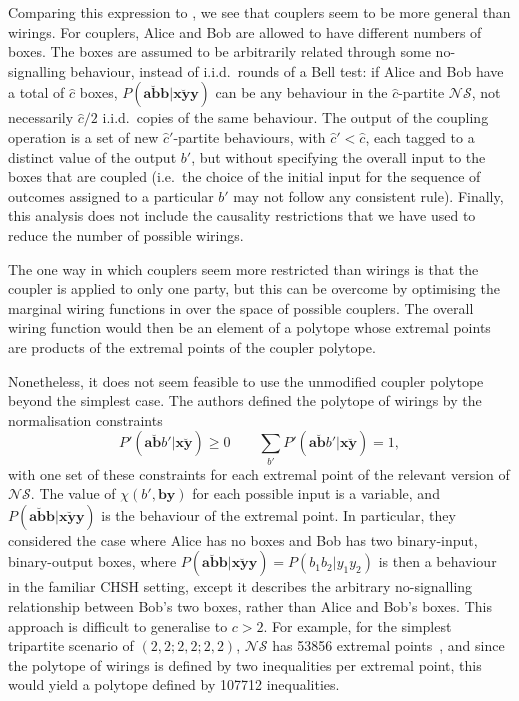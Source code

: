 \documentclass[10pt, a4paper]{article}
\numberwithin{equation}{section} %
\theoremstyle{definition}
\theoremstyle{plain}
\newcommand{\?}{\mathrel{?}} %
\newcommand{\cvec}[1]{\boldsymbol{\mathbf{#1}}}    %
\newcommand{\NSs}{\mathcal{NS}}
\begin{document}

      Comparing this expression to , we see that couplers seem to be more general than wirings. For couplers, Alice and Bob are allowed to have different numbers of boxes. The boxes are assumed to be arbitrarily related through some no-signalling behaviour, instead of i.i.d.\ rounds of a Bell test: if Alice and Bob have a total of \(\hat{c}\) boxes, \(P(\cvec{a\breve{b}b}|\cvec{x\breve{y}y})\) can be any behaviour in the \(\hat{c}\)-partite \(\NSs\), not necessarily \(\hat{c}/2\) i.i.d.\ copies of the same behaviour. The output of the coupling operation is a set of new \(\hat{c}'\)-partite behaviours, with \(\hat{c}' < \hat{c}\), each tagged to a distinct value of the output \(b'\), but without specifying the overall input to the boxes that are coupled (i.e.\ the choice of the initial input for the sequence of outcomes assigned to a particular \(b'\) may not follow any consistent rule). Finally, this analysis does not include the causality restrictions that we have used to reduce the number of possible wirings.

      The one way in which couplers seem more restricted than wirings is that the coupler is applied to only one party, but this can be overcome by optimising the marginal wiring functions in  over the space of possible couplers. The overall wiring function would then be an element of a polytope whose extremal points are products of the extremal points of the coupler polytope.

      Nonetheless, it does not seem feasible to use the unmodified coupler polytope beyond the simplest case. The authors defined the polytope of wirings by the normalisation constraints
      \begin{equation}
          P'(\cvec{a\breve{b}}b'|\cvec{x\breve{y}}) \geq 0 \qquad \sum_{b'} P'(\cvec{a\breve{b}}b'|\cvec{x\breve{y}}) = 1,
      \end{equation}
      with one set of these constraints for each extremal point of the relevant version of \(\NSs\). The value of \(\chi(b',\cvec{by})\) for each possible input is a variable, and \(P(\cvec{a\breve{b}b}|\cvec{x\breve{y}y})\) is the behaviour of the extremal point. In particular, they considered the case where Alice has no boxes and Bob has two binary-input, binary-output boxes, where \(P(\cvec{a\breve{b}b}|\cvec{x\breve{y}y}) = P(b_1b_2|y_1y_2)\) is then a behaviour in the familiar CHSH setting, except it describes the arbitrary no-signalling relationship between Bob's two boxes, rather than Alice and Bob's boxes. This approach is difficult to generalise to \(c > 2\). For example, for the simplest tripartite scenario of \((2,2; 2,2; 2,2)\), \(\NSs\) has 53856 extremal points~\cite{Tripartite}, and since the polytope of wirings is defined by two inequalities per extremal point, this would yield a polytope defined by 107712 inequalities.
\end{document}
